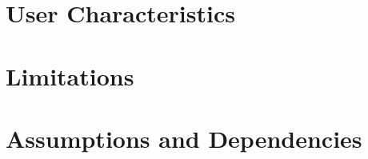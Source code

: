 \documentclass{scrreprt}
\begin{document}

\section{User Characteristics}

\section{Limitations}

\section{Assumptions and Dependencies}

\end{document}

